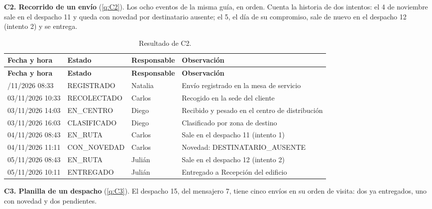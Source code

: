 \textbf{C2. Recorrido de un envío} (\ref{q:C2}). Los ocho eventos de la
misma guía, en orden. Cuenta la historia de dos intentos: el 4 de noviembre
sale en el despacho 11 y queda con novedad por destinatario ausente; el 5, el día de su compromiso,
sale de nuevo en el despacho 12 (intento 2) y se entrega.

{\singlespacing\small
\begin{longtable}{L{2.9cm} L{2.9cm} L{2.3cm} L{5.3cm}}
\caption{Resultado de C2.}
\label{tab:proto-c2}\\
\toprule
\textbf{Fecha y hora} & \textbf{Estado} & \textbf{Responsable} & \textbf{Observación} \\
\midrule
\endfirsthead
\toprule
\textbf{Fecha y hora} & \textbf{Estado} & \textbf{Responsable} & \textbf{Observación} \\
\midrule
\endhead
\bottomrule
{}/11/2026 08:33 & REGISTRADO & Natalia & Envío registrado en la mesa de servicio \\
03/11/2026 10:33 & RECOLECTADO & Carlos & Recogido en la sede del cliente \\
03/11/2026 14:03 & EN\_CENTRO & Diego & Recibido y pesado en el centro de distribución \\
03/11/2026 16:03 & CLASIFICADO & Diego & Clasificado por zona de destino \\
04/11/2026 08:43 & EN\_RUTA & Carlos & Sale en el despacho 11 (intento 1) \\
04/11/2026 11:11 & CON\_NOVEDAD & Carlos & Novedad: DESTINATARIO\_AUSENTE \\
05/11/2026 08:43 & EN\_RUTA & Julián & Sale en el despacho 12 (intento 2) \\
05/11/2026 10:11 & ENTREGADO & Julián & Entregado a Recepción del edificio \\
\end{longtable}
\par}

\textbf{C3. Planilla de un despacho} (\ref{q:C3}). El despacho 15, del
mensajero 7, tiene cinco envíos en su orden de visita: dos ya
entregados, uno con novedad y dos pendientes.

